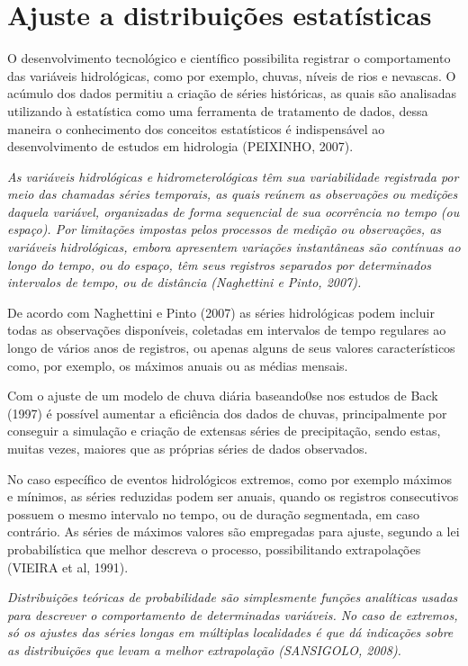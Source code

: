 \section{Ajuste a distribuições estatísticas}

O desenvolvimento tecnológico e científico possibilita registrar o comportamento das variáveis hidrológicas, como por exemplo, chuvas, níveis de rios e nevascas. O acúmulo dos dados permitiu a criação de séries históricas, as quais são analisadas utilizando à estatística como uma ferramenta de tratamento de dados, dessa maneira o conhecimento dos conceitos estatísticos é indispensável ao desenvolvimento de estudos em hidrologia (PEIXINHO, 2007).

\textit{As variáveis hidrológicas e hidrometerológicas têm sua variabilidade registrada por meio das chamadas séries temporais, as quais reúnem as observações ou medições daquela variável, organizadas de forma sequencial de sua ocorrência no tempo (ou espaço). Por limitações impostas pelos processos de medição ou observações, as variáveis hidrológicas, embora apresentem variações instantâneas são contínuas ao longo do tempo, ou do espaço, têm seus registros separados por determinados intervalos de tempo, ou de distância (Naghettini e Pinto, 2007).}

De acordo com Naghettini e Pinto (2007) as séries hidrológicas podem incluir todas as observações disponíveis, coletadas em intervalos de tempo regulares ao longo de vários anos de registros, ou apenas alguns de seus valores característicos como, por exemplo, os máximos anuais ou as médias mensais. 

Com o ajuste de um modelo de chuva diária baseando0se nos estudos de Back (1997) é possível aumentar a eficiência dos dados de chuvas, principalmente por conseguir a simulação e criação de extensas séries de precipitação, sendo estas, muitas vezes, maiores que as próprias séries de dados observados.

No caso específico de eventos hidrológicos extremos, como por exemplo máximos e mínimos, as séries reduzidas podem ser anuais, quando os registros consecutivos possuem o mesmo intervalo no tempo, ou de duração segmentada, em caso contrário.
As séries de máximos valores são empregadas para ajuste, segundo a lei probabilística que melhor descreva o processo, possibilitando extrapolações (VIEIRA et al, 1991).

\textit{Distribuições teóricas de probabilidade são simplesmente funções analíticas usadas para descrever o comportamento de determinadas variáveis. No caso de extremos, só os ajustes das séries longas em múltiplas localidades é que dá indicações sobre as distribuições que levam a melhor extrapolação (SANSIGOLO, 2008).}

